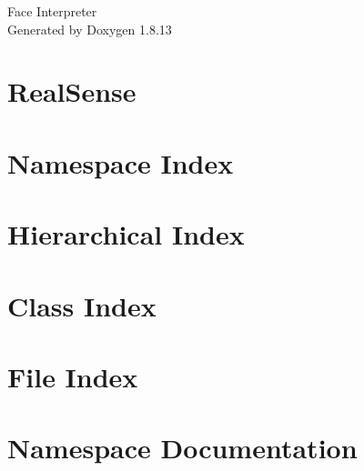 \documentclass[twoside]{book}
\newcommand{\+}{\discretionary{\mbox{\scriptsize$\hookleftarrow$}}{}{}}
\newcommand{\clearemptydoublepage}{%
  \newpage{\pagestyle{empty}\cleardoublepage}%
}
\begin{document}
\hypersetup{pageanchor=false,
             bookmarksnumbered=true,
             pdfencoding=unicode
            }
\begin{titlepage}
\vspace*{7cm}
\begin{center}%
{\Large Face Interpreter }\\
\vspace*{1cm}
{\large Generated by Doxygen 1.8.13}\\
\end{center}
\end{titlepage}
\clearemptydoublepage
{}
\tableofcontents
\clearemptydoublepage
{}
\hypersetup{pageanchor=true}

\chapter{Real\+Sense}
\label{md__c_1__users_nutzer__documents__git_hub__real_sense__r_e_a_d_m_e}

\chapter{Namespace Index}

\chapter{Hierarchical Index}

\chapter{Class Index}

\chapter{File Index}

\chapter{Namespace Documentation}



\end{document}
